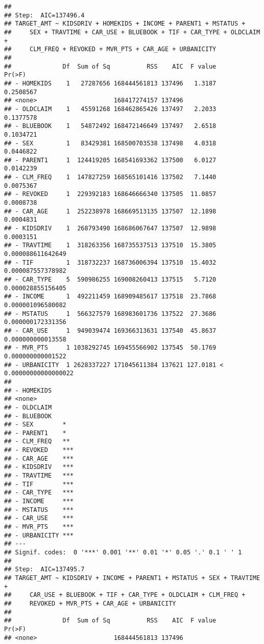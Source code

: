 \documentclass[
]{article}
\begin{document}
\begin{verbatim}
## 
## Step:  AIC=137496.4
## TARGET_AMT ~ KIDSDRIV + HOMEKIDS + INCOME + PARENT1 + MSTATUS + 
##     SEX + TRAVTIME + CAR_USE + BLUEBOOK + TIF + CAR_TYPE + OLDCLAIM + 
##     CLM_FREQ + REVOKED + MVR_PTS + CAR_AGE + URBANICITY
## 
##              Df  Sum of Sq          RSS    AIC  F value                Pr(>F)
## - HOMEKIDS    1   27287656 168444561813 137496   1.3187             0.2508567
## <none>                     168417274157 137496                               
## - OLDCLAIM    1   45591268 168462865426 137497   2.2033             0.1377578
## - BLUEBOOK    1   54872492 168472146649 137497   2.6518             0.1034721
## - SEX         1   83429381 168500703538 137498   4.0318             0.0446822
## - PARENT1     1  124419205 168541693362 137500   6.0127             0.0142239
## - CLM_FREQ    1  147827259 168565101416 137502   7.1440             0.0075367
## - REVOKED     1  229392183 168646666340 137505  11.0857             0.0008738
## - CAR_AGE     1  252238978 168669513135 137507  12.1898             0.0004831
## - KIDSDRIV    1  268793490 168686067647 137507  12.9898             0.0003151
## - TRAVTIME    1  318263356 168735537513 137510  15.3805     0.000088611642649
## - TIF         1  318732237 168736006394 137510  15.4032     0.000087557378982
## - CAR_TYPE    5  590986255 169008260413 137515   5.7120     0.000028855156405
## - INCOME      1  492211459 168909485617 137518  23.7868     0.000001096580082
## - MSTATUS     1  566327579 168983601736 137522  27.3686     0.000000172331356
## - CAR_USE     1  949039474 169366313631 137540  45.8637     0.000000000013558
## - MVR_PTS     1 1038292745 169455566902 137545  50.1769     0.000000000001522
## - URBANICITY  1 2628337227 171045611384 137621 127.0181 < 0.00000000000000022
##                 
## - HOMEKIDS      
## <none>          
## - OLDCLAIM      
## - BLUEBOOK      
## - SEX        *  
## - PARENT1    *  
## - CLM_FREQ   ** 
## - REVOKED    ***
## - CAR_AGE    ***
## - KIDSDRIV   ***
## - TRAVTIME   ***
## - TIF        ***
## - CAR_TYPE   ***
## - INCOME     ***
## - MSTATUS    ***
## - CAR_USE    ***
## - MVR_PTS    ***
## - URBANICITY ***
## ---
## Signif. codes:  0 '***' 0.001 '**' 0.01 '*' 0.05 '.' 0.1 ' ' 1
## 
## Step:  AIC=137495.7
## TARGET_AMT ~ KIDSDRIV + INCOME + PARENT1 + MSTATUS + SEX + TRAVTIME + 
##     CAR_USE + BLUEBOOK + TIF + CAR_TYPE + OLDCLAIM + CLM_FREQ + 
##     REVOKED + MVR_PTS + CAR_AGE + URBANICITY
## 
##              Df  Sum of Sq          RSS    AIC  F value                Pr(>F)
## <none>                     168444561813 137496                               

\end{verbatim}
\end{document}
